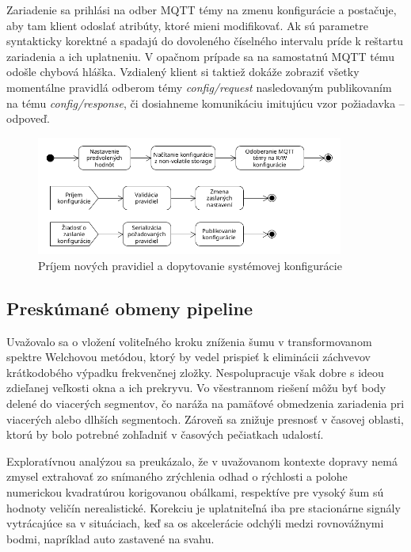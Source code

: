Zariadenie sa prihlási na odber MQTT témy na zmenu konfigurácie a postačuje, aby tam klient odoslať atribúty, ktoré mieni
modifikovať. Ak sú parametre syntakticky korektné a spadajú do dovoleného číselného intervalu príde k reštartu zariadenia a ich
uplatneniu. V opačnom prípade sa na samostatnú MQTT tému odošle chybová hláška. Vzdialený klient si taktiež dokáže zobraziť 
všetky momentálne pravidlá odberom témy \emph{config/request} nasledovaným publikovaním na tému \emph{config/response}, či 
dosiahneme komunikáciu imitujúcu vzor požiadavka -- odpoveď.

\begin{figure}[h]
	\centering
	\includegraphics[width=0.9\textwidth]{figures/design/configuration.png}
	\caption{Príjem nových pravidiel a dopytovanie systémovej konfigurácie}
	\label{config-change}
\end{figure}

\subsection{Preskúmané obmeny pipeline}
Uvažovalo sa o vložení voliteľného kroku zníženia šumu v transformovanom spektre Welchovou metódou, ktorý by vedel prispieť
k eliminácii záchvevov krátkodobého výpadku frekvenčnej zložky. Nespolupracuje však dobre s ideou zdieľanej veľkosti okna a 
ich prekryvu. Vo všestrannom riešení môžu byť body delené do viacerých segmentov, čo naráža na pamäťové obmedzenia zariadenia
pri viacerých alebo dlhších segmentoch. Zároveň sa znižuje presnosť v časovej oblasti, ktorú by bolo potrebné zohľadniť v časových
pečiatkach udalostí. 

Exploratívnou analýzou sa preukázalo, že v uvažovanom kontexte dopravy nemá zmysel extrahovať zo snímaného zrýchlenia odhad
o rýchlosti a polohe numerickou kvadratúrou korigovanou obálkami, respektíve pre vysoký šum sú hodnoty veličín nerealistické.
Korekciu je uplatniteľná iba pre stacionárne signály vytrácajúce sa v situáciach, keď sa os akcelerácie odchýli medzi 
rovnovážnymi bodmi, napríklad auto zastavené na svahu.


